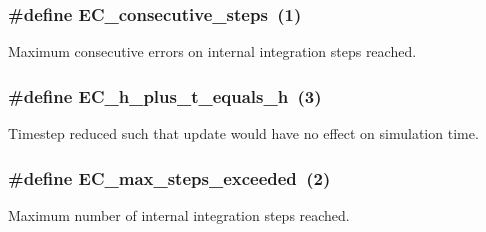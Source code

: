 \subsubsection[{\texorpdfstring{E\+C\+\_\+consecutive\+\_\+steps}{EC_consecutive_steps}}]{\setlength{\rightskip}{0pt plus 5cm}\#define E\+C\+\_\+consecutive\+\_\+steps~(1)}\hypertarget{group__exprb43__ErrCodes_gae0287841c08f86f5709660fd731615ad}{}\label{group__exprb43__ErrCodes_gae0287841c08f86f5709660fd731615ad}


Maximum consecutive errors on internal integration steps reached. 

\subsubsection[{\texorpdfstring{E\+C\+\_\+h\+\_\+plus\+\_\+t\+\_\+equals\+\_\+h}{EC_h_plus_t_equals_h}}]{\setlength{\rightskip}{0pt plus 5cm}\#define E\+C\+\_\+h\+\_\+plus\+\_\+t\+\_\+equals\+\_\+h~(3)}\hypertarget{group__exprb43__ErrCodes_ga9326efd544880e2683c4453365ca2704}{}\label{group__exprb43__ErrCodes_ga9326efd544880e2683c4453365ca2704}


Timestep reduced such that update would have no effect on simulation time. 

\subsubsection[{\texorpdfstring{E\+C\+\_\+max\+\_\+steps\+\_\+exceeded}{EC_max_steps_exceeded}}]{\setlength{\rightskip}{0pt plus 5cm}\#define E\+C\+\_\+max\+\_\+steps\+\_\+exceeded~(2)}\hypertarget{group__exprb43__ErrCodes_ga0f0275d9851ab5c19b79a963d5084df3}{}\label{group__exprb43__ErrCodes_ga0f0275d9851ab5c19b79a963d5084df3}


Maximum number of internal integration steps reached. 

